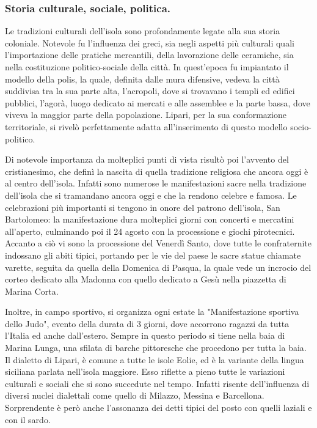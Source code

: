 \documentclass[fleqn,11pt]{SelfArx} %
\begin{document}
\subsubsection{Storia culturale, sociale, politica.}
Le tradizioni culturali dell'isola sono profondamente legate alla sua storia coloniale. Notevole fu l'influenza dei greci, sia negli aspetti più culturali quali l'importazione delle pratiche mercantili, della lavorazione delle ceramiche, sia nella costituzione politico-sociale della città. In quest'epoca fu impiantato il modello della polis, la quale, definita dalle mura difensive, vedeva la città suddivisa tra la sua parte alta, l'acropoli, dove si trovavano i templi ed edifici pubblici, l'agorà, luogo dedicato ai mercati e alle assemblee e la parte bassa, dove viveva la maggior parte della popolazione. Lipari, per la sua conformazione territoriale, si rivelò perfettamente adatta all'inserimento di questo modello socio-politico.

Di notevole importanza da molteplici punti di vista risultò poi l'avvento del cristianesimo, che definì la  nascita di quella tradizione religiosa che ancora oggi è al centro dell'isola. Infatti sono numerose le manifestazioni sacre nella tradizione dell'isola che si tramandano ancora oggi  e che la rendono celebre e famosa. Le celebrazioni più importanti si tengono in onore del patrono dell'isola, San Bartolomeo: la manifestazione dura molteplici giorni con concerti e mercatini all'aperto, culminando poi il 24 agosto con la processione e giochi pirotecnici. Accanto a ciò vi sono la processione del Venerdì Santo, dove tutte le confraternite indossano gli abiti tipici, portando per le vie del paese le sacre statue chiamate varette, seguita da quella della Domenica di Pasqua, la quale vede un incrocio del corteo dedicato alla Madonna con quello dedicato a Gesù nella piazzetta di Marina Corta. 

Inoltre, in campo sportivo, si organizza ogni estate la "Manifestazione sportiva dello Judo", evento della durata di 3 giorni, dove accorrono ragazzi da tutta l'Italia ed anche dall'estero. Sempre in questo periodo si tiene nella baia di Marina Lunga, una sfilata di barche pittoresche che procedono per tutta la baia. 
Il dialetto di Lipari, è comune a tutte le isole Eolie, ed è la variante della lingua siciliana parlata nell'isola maggiore. Esso riflette a pieno tutte le variazioni culturali e sociali che si sono succedute nel tempo. Infatti risente dell'influenza di diversi nuclei dialettali come quello di Milazzo, Messina e Barcellona. Sorprendente è però anche l'assonanza dei detti tipici del posto con quelli laziali e con il sardo. 
\end{document}
